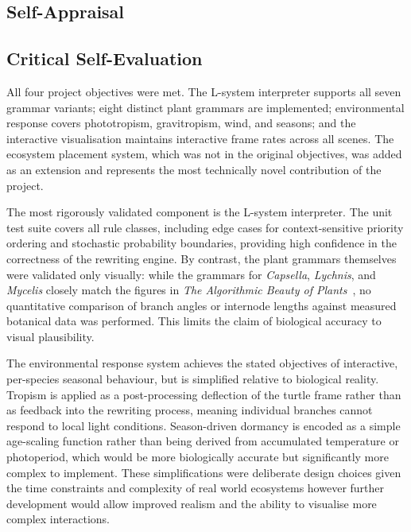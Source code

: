 \begin{appendices}

\chapter{Self-Appraisal}
\label{app:selfappraisal}

\section{Critical Self-Evaluation}

All four project objectives were met. The L-system interpreter supports all seven grammar variants; eight
distinct plant grammars are implemented; environmental response covers phototropism, gravitropism, wind, and
seasons; and the interactive visualisation maintains interactive frame rates across all scenes. The ecosystem
placement system, which was not in the original objectives, was added as an extension and represents the most
technically novel contribution of the project.

\medskip
The most rigorously validated component is the L-system interpreter. The unit test suite covers all rule
classes, including edge cases for context-sensitive priority ordering and stochastic probability boundaries,
providing high confidence in the correctness of the rewriting engine. By contrast, the plant grammars
themselves were validated only visually: while the grammars for \textit{Capsella}, \textit{Lychnis}, and
\textit{Mycelis} closely match the figures in \textit{The Algorithmic Beauty of
Plants}~\cite{prusinkiewiczAlgorithmicBeautyPlants1990}, no quantitative comparison of branch angles or
internode lengths against measured botanical data was performed. This limits the claim of biological accuracy
to visual plausibility.

\medskip
The environmental response system achieves the stated objectives of interactive, per-species seasonal
behaviour, but is simplified relative to biological reality. Tropism is applied as a post-processing
deflection of the turtle frame rather than as feedback into the rewriting process, meaning individual branches
cannot respond to local light conditions. Season-driven dormancy is encoded as a simple age-scaling function
rather than being derived from accumulated temperature or photoperiod, which would be more biologically
accurate but significantly more complex to implement. These simplifications were deliberate design choices
given the time constraints and complexity of real world ecosystems however further development would allow
improved realism and the ability to visualise more complex interactions.


\end{appendices}
